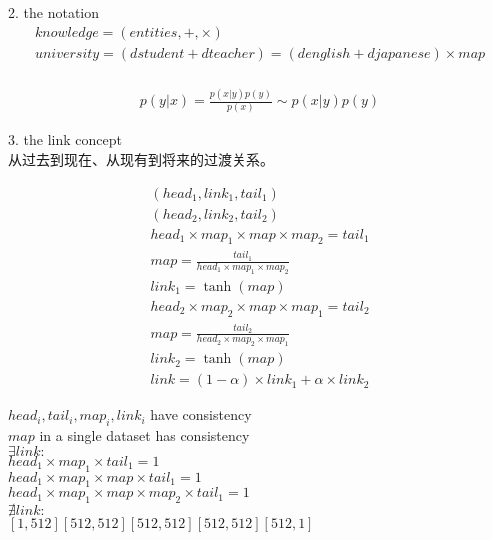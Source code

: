 \documentclass[12pt]{ctexart}
\theoremstyle{definition}
\begin{document}
2. the notation\\
\[\begin{array}{l}
knowledge=(entities,+,\times)\\
university=(dstudent+dteacher)=(denglish+djapanese)\times map\\
\end{array}\]

\[\begin{array}{l}
p(y|x)=\frac{p(x|y)p(y)}{p(x)}\sim p(x|y)p(y)
\end{array}\]

3. the link concept\\
从过去到现在、从现有到将来的过渡关系。

\[\begin{array}{l}
(head_1, link_1, tail_1)\\
(head_2, link_2, tail_2)\\

head_1\times map_1\times map\times map_2=tail_1\\
map=\frac{tail_1}{head_1\times map_1\times map_2}\\
link_1=\tanh(map)\\

head_2\times map_2\times map\times map_1=tail_2\\
map=\frac{tail_2}{head_2\times map_2\times map_1}\\
link_2=\tanh(map)\\

link=(1-\alpha)\times link_1+\alpha\times link_2
\end{array}\]

$head_i,tail_i,map_i,link_i$ have consistency\\
$map$ in a single dataset has consistency\\

$\exists link:$\\
$head_1\times map_1\times tail_1=1$\\
$head_1\times map_1\times map\times tail_1=1$\\
$head_1\times map_1\times map\times map_2\times tail_1=1$\\
$\nexists link:$\\
$[1,512] [512, 512] [512, 512] [512, 512] [512,1]$
\end{document}
